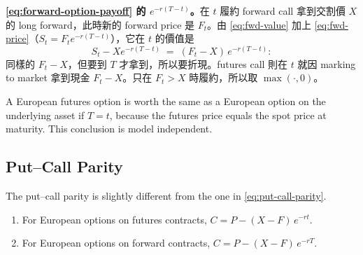 \suppstart
{}

\begin{remark}
	\textbf{\eqref{eq:forward-option-payoff} 的 $e^{-r(T-t)}$。}在 $t$ 履約 forward call 拿到交割價 $X$ 的 long forward，此時新的 forward price 是 $F_{t}$。由 \eqref{eq:fwd-value} 加上 \eqref{eq:fwd-price}（$S_{t}=F_{t}e^{-r(T-t)}$），它在 $t$ 的價值是
	\[
		S_{t}-Xe^{-r(T-t)} \;=\; (F_{t}-X)\,e^{-r(T-t)} :
	\]
	同樣的 $F_{t}-X$，但要到 $T$ 才拿到，所以要折現。futures call 則在 $t$ 就因 marking to market 拿到現金 $F_{t}-X$。只在 $F_{t}>X$ 時履約，所以取 $\max(\cdot,0)$。
\end{remark}
\suppend

A European futures option is worth the same as a European option on the underlying asset if $T=t$, because the futures price equals the spot price at maturity.
This conclusion is model independent.

\suppstart
{}
\suppend

\subsection{Put--Call Parity}


The put--call parity is slightly different from the one in \eqref{eq:put-call-parity}.

\begin{theorem}
	\label{thm:futures-parity}
	\begin{enumerate}[(1),nosep]
		\item For European options on futures contracts, $C=P-(X-F)\,e^{-rt}$.
		\item For European options on forward contracts, $C=P-(X-F)\,e^{-rT}$.
	\end{enumerate}
\end{theorem}

\suppstart
{}

